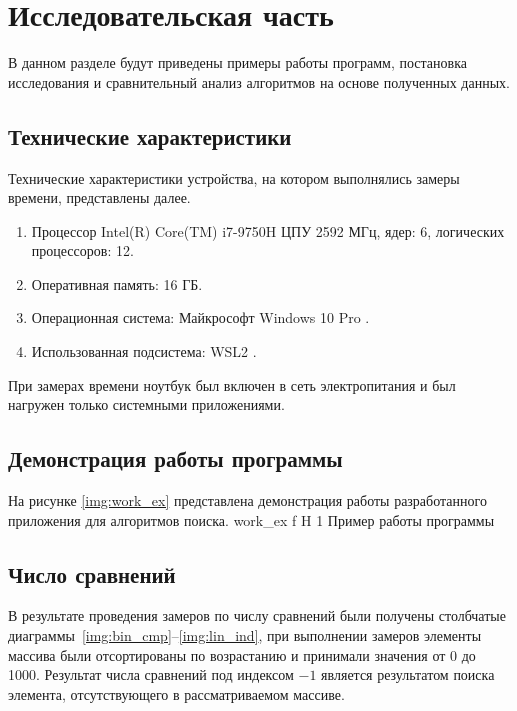 \chapter{Исследовательская часть}

В данном разделе будут приведены примеры работы программ, постановка исследования и сравнительный анализ алгоритмов на основе полученных данных.


\section{Технические характеристики}

Технические характеристики устройства, на котором выполнялись замеры времени, представлены далее.

\begin{enumerate}
	\item Процессор	Intel(R) Core(TM) i7-9750H ЦПУ 2592 МГц, ядер: 6, логических процессоров: 12.
	\item Оперативная память: 16 ГБ.
	\item Операционная система: Майкрософт Windows 10 Pro \cite{windows}.
	\item Использованная подсистема: WSL2 \cite{WSL2}.
\end{enumerate}

При замерах времени ноутбук был включен в сеть электропитания и был нагружен только системными приложениями.



\section{Демонстрация работы программы}

На рисунке \ref{img:work_ex} представлена демонстрация работы разработанного приложения для алгоритмов поиска.
{work_ex} %
{f} %
{H} %
{1\textwidth} %
{Пример работы программы} %



\section{Число сравнений}

В результате проведения замеров по числу сравнений были получены столбчатые диаграммы~\ref{img:bin_cmp}--\ref{img:lin_ind}, при выполнении замеров элементы массива были отсортированы по возрастанию и принимали значения от 0 до 1000. Результат числа сравнений под индексом $-1$ является результатом поиска элемента, отсутствующего в рассматриваемом массиве.

